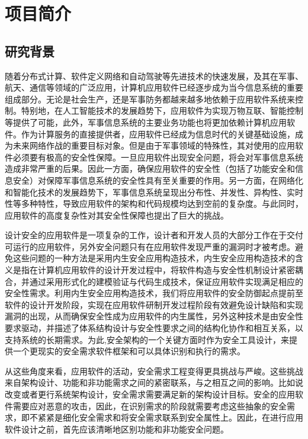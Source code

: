 \chapter{项目简介}
\section{研究背景}
\par
随着分布式计算、软件定义网络和自动驾驶等先进技术的快速发展，及其在军事、航天、通信等领域的广泛应用，计算机应用软件已经逐步成为当今信息系统的重要组成部分。无论是社会生产，还是军事防务都越来越多地依赖于应用软件系统来控制。特别地，在人工智能技术的发展趋势下，应用软件为实现万物互联、智能控制等提供了可能，此外，军事信息系统的主要业务功能也将更加依赖计算机应用软件。作为计算服务的直接提供者，应用软件已经成为信息时代的关键基础设施，成为未来网络作战的重要目标对象。但是由于军事领域的特殊性，其对使用的应用软件必须要有极高的安全性保障。一旦应用软件出现安全问题，将会对军事信息系统造成非常严重的后果。因此一方面，确保应用软件的安全性（包括了功能安全和信息安全）对保障军事信息系统的安全性具有至关重要的作用。另一方面，在网络化和智能化技术的发展趋势下，军事信息系统呈现出分布性、并发性、异构性、实时性等多种特性，导致应用软件的架构和代码规模均达到空前的复杂度。与此同时，应用软件的高度复杂性对其安全性保障也提出了巨大的挑战。
\par
设计安全的应用软件是一项复杂的工作，设计者和开发人员的大部分工作在于交付可运行的应用软件，另外安全问题只有在应用软件发现严重的漏洞时才被考虑。避免这些问题的一种方法是采用内生安全应用构造技术，内生安全应用构造技术的含义是指在计算机应用软件的设计开发过程中，将软件构造与安全性机制设计紧密耦合，并通过采用形式化的建模验证与代码生成技术，保证应用软件实现满足相应的安全性需求。利用内生安全应用构造技术，我们将应用软件的安全防御起点提前至软件的设计开发阶段，实现在应用软件研制开发过程阶段有效避免设计缺陷和实现漏洞的出现，从而确保安全性成为应用软件的内生属性，另外这种技术是由安全性要求驱动，并描述了体系结构设计与安全性要求之间的结构化协作和相互关系，以支持系统的长期需求。为此,安全架构的一个关键方面时作为安全工具设计，来提供一个更现实的安全需求软件框架和可以具体识别和执行的需求。
\par
从这些角度来看，应用软件的活动，安全需求工程变得更具挑战与严峻。这些挑战来自架构设计、功能和非功能需求之间的紧密联系，与之相互之间的影响。比如说改变或者更行系统架构设计，安全需求需要满足新的架构设计目标。安全的应用软件需要应对恶意的攻击，因此，在识别需求的阶段就需要考虑这些抽象的安全需求，即不紧紧是细化安全需求和将安全需求联系到安全属性上。因此，在进行应用软件设计之前，首先应该清晰地区别功能和非功能安全问题。
